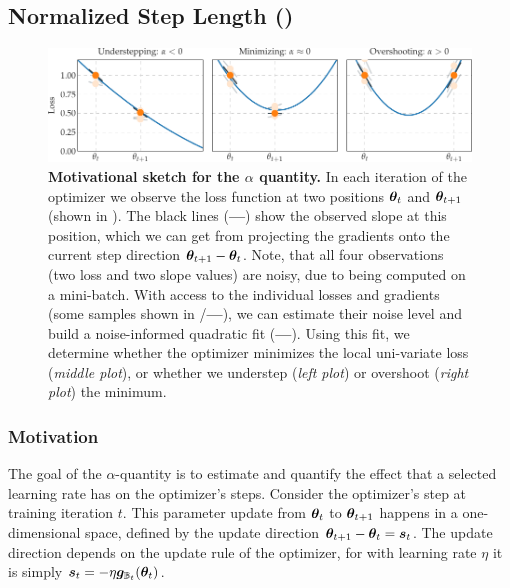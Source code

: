 \subsection{Normalized Step Length
  ()}\label{cockpit::app:alpha}

\begin{figure}
  \includegraphics[width =
  \linewidth]{../repos/cockpit-paper/fig/12_alpha_explanation/output/alpha_explanation_thesis-wide}
  \caption{\textbf{Motivational sketch for the $\alpha$ quantity.} In each
    iteration of the optimizer we observe the loss function at two positions
    ${\bm{\theta}}_{t}$ and ${\bm{\theta}}_{t+1}$ (shown in
    \textcolor{sns_orange}{}). The black lines
    (\textcolor{TUdark}{\textbf{---}}) show the observed slope at this position,
    which we can get from projecting the gradients onto the current step
    direction ${\bm{\theta}}_{t+1} - {\bm{\theta}}_{t}$. Note, that all four observations
    (two loss and two slope values) are noisy, due to being computed on a
    mini-batch. With access to the individual losses and gradients (some samples
    shown in
    \textcolor{sns_orange_light}{}/\textcolor{TUgray}{\textbf{---}}),
    we can estimate their noise level and build a noise-informed quadratic fit
    (\textcolor{sns_blue}{\textbf{---}}). Using this fit, we determine whether
    the optimizer minimizes the local uni-variate loss (\textit{middle plot}), or
    whether we understep (\textit{left plot}) or overshoot (\textit{right plot})
    the minimum.}
  \label{cockpit::fig:alpha_explanation}
\end{figure}

\subsubsection{Motivation}

The goal of the $\alpha$-quantity is to estimate and quantify the effect that a
selected learning rate has on the optimizer's steps. Consider the optimizer's
step at training iteration $t$. This parameter update from ${\bm{\theta}}_{t}$ to
${\bm{\theta}}_{t+1}$ happens in a one-dimensional space, defined by the update
direction ${\bm{\theta}}_{t+1} - {\bm{\theta}}_{t}={\bm{s}}_t$. The update direction depends on
the update rule of the optimizer, \eg for \sgd with learning rate $\eta$ it is
simply ${\bm{s}}_t =- \eta {\bm{g}}_{{\mathbb{B}}_t}({\bm{\theta}}_{t})$.

